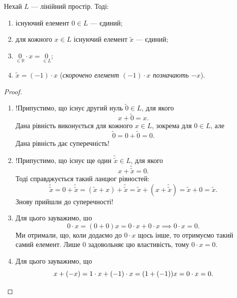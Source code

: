 \documentclass{math_library}
\begin{document}
	\begin{proposition}
	Нехай $L$ --- лінійний простір. Тоді:
	\begin{enumerate}[nosep, wide=0pt, label={\arabic*)}]	
	\item існуючий елемент $0 \in L$ --- єдиний;
	\item для кожного $x \in L$ існуючий елемент $\tilde{x}$ --- єдиний;
	\item $\underset{\in \mathbb{R}}{0} \cdot x = \underset{\in L}{0}$;
	\item $\tilde{x} = (-1) \cdot x$ (\textit{скорочено елемент $(-1) \cdot x$ позначають $-x$}).
	\end{enumerate}
	\end{proposition}
	
	\begin{proof}
	\leavevmode
	\begin{enumerate}[topsep=0pt, wide=0pt, label={\arabic*)}]
	\item !Припустимо, що існує другий нуль $\tilde{0} \in L$, для якого
	\[
	x + \tilde{0} = x.
	\]
	Дана рівність виконується для кожного $x \in L$, зокрема для $0 \in L$, але
	\[
	\tilde{0} = 0 + \tilde{0} = 0.
	\]
	Дана рівність дає суперечність!
	
	\item !Припустимо, що існує ще один $\tilde{\tilde{x}} \in L$, для якого
	\[
	x + \tilde{\tilde{x}} = 0.
	\] 
	Тоді справджується такий ланцюг рівностей:
	\[
	\tilde{\tilde{x}} = 0 + \tilde{\tilde{x}} = (\tilde{x} + x) + \tilde{\tilde{x}} = \tilde{x} + (x + \tilde{\tilde{x}}) = \tilde{x} + 0 = \tilde{x}.
	\]
	Знову прийшли до суперечності!
	
	\item Для цього зауважимо, шо
	\[
	0 \cdot x = (0 + 0)x = 0\cdot x + 0 \cdot x \implies 0 \cdot x = 0.
	\]
	Ми отримали, що, коли додаємо до $0 \cdot x$ щось інше, то отримуємо такий самий елемент. Лише $0$ задовольняє цю властивість, тому $0 \cdot x = 0$. 
	\item Для цього зауважимо, що
	\[
	x + (-x) = 1 \cdot x + (-1) \cdot x = (1 + (-1))x = 0 \cdot x = 0. \qedhere
	\]
	\end{enumerate}
	\end{proof}
	
\end{document}
